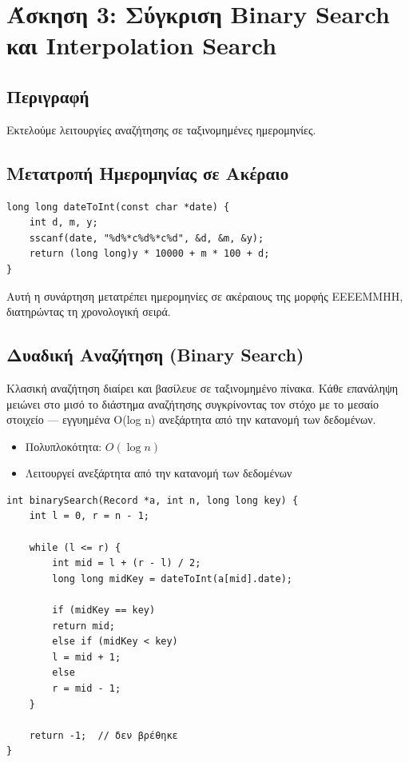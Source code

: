 \documentclass[a4paper,12pt]{article}
\begin{document}
	\newpage
	\section{Άσκηση 3: Σύγκριση Binary Search και Interpolation Search}
	
	\subsection{Περιγραφή}
	
	Εκτελούμε λειτουργίες αναζήτησης σε ταξινομημένες ημερομηνίες.
	
	\subsection{Μετατροπή Ημερομηνίας σε Ακέραιο}
	
	\begin{lstlisting}[caption=Μετατροπή Ημερομηνίας σε Ακέραιο]
long long dateToInt(const char *date) {
	int d, m, y;
	sscanf(date, "%d%*c%d%*c%d", &d, &m, &y);
	return (long long)y * 10000 + m * 100 + d;
}
	\end{lstlisting}
	
	Αυτή η συνάρτηση μετατρέπει ημερομηνίες σε ακέραιους της μορφής ΕΕΕΕΜΜΗΗ, διατηρώντας τη χρονολογική σειρά.
	
	\subsection{Δυαδική Αναζήτηση (Binary Search)}
	
	Κλασική αναζήτηση διαίρει και βασίλευε σε ταξινομημένο πίνακα. Κάθε επανάληψη μειώνει στο μισό το διάστημα αναζήτησης συγκρίνοντας τον στόχο με το μεσαίο στοιχείο — εγγυημένα O(log n) ανεξάρτητα από την κατανομή των δεδομένων.
	
	\begin{itemize}
		\item Πολυπλοκότητα: $O(\log n)$
		\item Λειτουργεί ανεξάρτητα από την κατανομή των δεδομένων
	\end{itemize}
	
	\begin{lstlisting}[caption=Υλοποίηση Binary Search]
int binarySearch(Record *a, int n, long long key) {
	int l = 0, r = n - 1;
	
	while (l <= r) {
		int mid = l + (r - l) / 2;
		long long midKey = dateToInt(a[mid].date);
		
		if (midKey == key)
		return mid;
		else if (midKey < key)
		l = mid + 1;
		else
		r = mid - 1;
	}
	
	return -1;  // δεν βρέθηκε
}
	\end{lstlisting}
	
\end{document}
